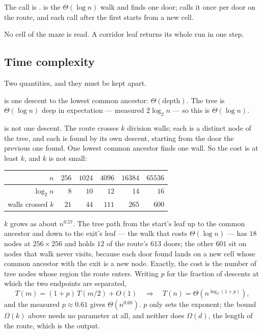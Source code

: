 The call is . \LCA{} is the $\Theta(\log n)$ walk and
finds one door; \Route{} calls it once per door on the route, and each call
after the first starts from a new cell.

No cell of the maze is read. A corridor leaf returns its whole run in one step.

\subsection{Time complexity}

Two quantities, and they must be kept apart.

 is one descent to the lowest common ancestor:
$\Theta(\text{depth})$. The tree is $\Theta(\log n)$ deep in expectation ---
measured $2\log_2 n$ --- so this is $\Theta(\log n)$.

 is not one descent. The route crosses
$k$ division walls; each is a distinct node of the tree, and each is found by
its own descent, starting from the door the previous one found. One lowest
common ancestor finds one wall. So the cost is at least $k$, and $k$ is not
small:

\begin{center}
\begin{tabular}{@{}rrrrrr@{}}
  \toprule
  $n$ & $256$ & $1024$ & $4096$ & $16384$ & $65536$ \\
  \midrule
  $\log_2 n$     & $8$  & $10$ & $12$  & $14$  & $16$ \\
  walls crossed $k$ & $21$ & $44$ & $111$ & $265$ & $600$ \\
  \bottomrule
\end{tabular}
\end{center}

$k$ grows as about $n^{0.57}$. The tree path from the start's leaf up to the
common ancestor and down to the exit's leaf --- the walk that costs
$\Theta(\log n)$ --- has $18$ nodes at $256\times256$ and holds $12$ of the
route's $613$ doors; the other $601$ sit on nodes that walk never visits, because
each door found lands on a new cell whose common ancestor with the exit is a new
node. Exactly, the cost is the number of tree nodes whose region the route
enters. Writing $p$ for the fraction of descents at
which the two endpoints are separated,
\[
  T(m)=(1+p)\,T(m/2)+O(1)
  \quad\Longrightarrow\quad
  T(n)=\Theta\!\left(n^{\log_2(1+p)}\right),
\]
and the measured $p\approx0.61$ gives $\Theta(n^{0.68})$. $p$ only sets the
exponent; the bound $\Omega(k)$ above needs no parameter at all, and neither
does $\Omega(d)$, the length of the route, which is the output.

